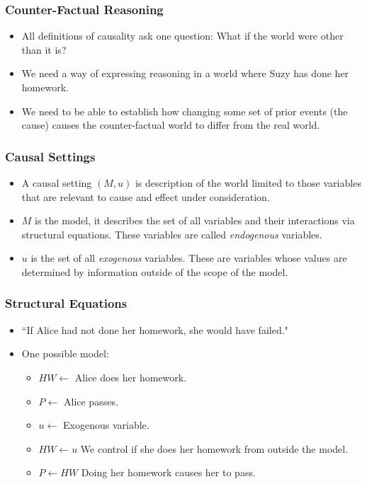 \documentclass{beamer}
\theoremstyle{plain}
\theoremstyle{definition}
\begin{document}
\begin{frame}
\frametitle{Counter-Factual Reasoning}
\begin{itemize}
\item All definitions of causality ask one question: What if the world were other than it is?
\item We need a way of expressing reasoning in a world where Suzy has done her homework.
\item We need to be able to establish how changing some set of prior events (the cause) causes the counter-factual world to differ from the real world.
\end{itemize}

\end{frame}

\begin{frame}
\frametitle{Causal Settings}
\begin{itemize}
\item A causal setting $(M,u)$ is description of the world limited to those variables that are relevant to cause and effect under consideration.
\item $M$ is the model, it describes the set of all variables and their interactions via structural equations. These variables are called \textit{endogenous} variables.
\item $u$ is the set of all \textit{exogenous} variables. These are variables whose values are determined by information outside of the scope of the model.

\end{itemize}


\end{frame}


\begin{frame}
\frametitle{Structural Equations}
\begin{itemize}
\item ``If Alice had not done her homework, she would have failed."
\item One possible model: 
\begin{itemize}
\item $HW \leftarrow$ Alice does her homework.
\item $P \leftarrow$ Alice passes.
\item $u \leftarrow$ Exogenous variable.
\item $HW \leftarrow u$ We control if she does her homework from outside the model.
\item $P \leftarrow HW$ Doing her homework causes her to pass.
\end{itemize}

\end{itemize}
\end{frame}
\end{document}
